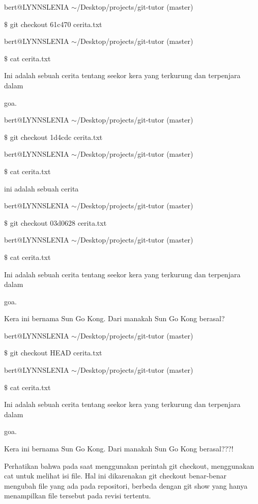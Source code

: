 bert@LYNNSLENIA  $  \sim  $/Desktop/projects/git-tutor (master) \par
 $  \$  $ git checkout 61c470 cerita.txt \par
\vspace{12pt}
bert@LYNNSLENIA  $  \sim  $/Desktop/projects/git-tutor (master) \par
 $  \$  $ cat cerita.txt \par
Ini adalah sebuah cerita tentang seekor kera yang terkurung dan terpenjara dalam \par
 goa. \par
bert@LYNNSLENIA  $  \sim  $/Desktop/projects/git-tutor (master) \par
 $  \$  $ git checkout 1d4cdc cerita.txt \par
\vspace{12pt}
bert@LYNNSLENIA  $  \sim  $/Desktop/projects/git-tutor (master) \par
 $  \$  $ cat cerita.txt \par
ini adalah sebuah cerita \par
\vspace{12pt}
bert@LYNNSLENIA  $  \sim  $/Desktop/projects/git-tutor (master) \par
 $  \$  $ git checkout 03d0628 cerita.txt \par
\vspace{12pt}
bert@LYNNSLENIA  $  \sim  $/Desktop/projects/git-tutor (master) \par
 $  \$  $ cat cerita.txt \par
Ini adalah sebuah cerita tentang seekor kera yang terkurung dan terpenjara dalam \par
 goa. \par
\vspace{12pt}
Kera ini bernama Sun Go Kong. Dari manakah Sun Go Kong berasal? \par
bert@LYNNSLENIA  $  \sim  $/Desktop/projects/git-tutor (master) \par
 $  \$  $ git checkout HEAD cerita.txt \par
\vspace{12pt}
bert@LYNNSLENIA  $  \sim  $/Desktop/projects/git-tutor (master) \par
 $  \$  $ cat cerita.txt \par
Ini adalah sebuah cerita tentang seekor kera yang terkurung dan terpenjara dalam \par
 goa. \par
\vspace{12pt}
Kera ini bernama Sun Go Kong. Dari manakah Sun Go Kong berasal???! \par
\vspace{11pt}
\noindent 
{\fontsize{11pt}{11pt}\selectfont  \hspace*{0.50in} Perhatikan bahwa pada saat menggunakan perintah git checkout, menggunakan cat untuk melihat isi file. Hal ini dikarenakan git checkout benar-benar mengubah file yang ada pada repositori, berbeda dengan git show yang hanya menampilkan file tersebut pada revisi tertentu.} \par

